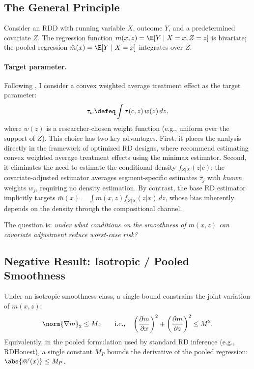 \subsection{The General Principle}\label{sec:overview:principle}

Consider an RDD with running variable $X$, outcome $Y$, and a predetermined covariate $Z$.
The regression function $m(x,z) = \E[Y \mid X = x, Z = z]$ is bivariate; the pooled regression $\bar{m}(x) = \E[Y \mid X = x]$ integrates over $Z$.

\paragraph{Target parameter.}
Following \textcite{imbens_optimized_2019}, I consider a convex weighted average treatment effect as the target parameter:
\begin{equation*}
	\tau_w \defeq \int \tau(c, z)\, w(z)\, dz,
\end{equation*}
where $w(z)$ is a researcher-chosen weight function (e.g., uniform over the support of $Z$).
This choice has two key advantages.
First, it places the analysis directly in the framework of optimized RD designs, where \textcite{imbens_optimized_2019} recommend estimating convex weighted average treatment effects using the minimax estimator.
Second, it eliminates the need to estimate the conditional density $f_{Z|X}(z|c)$: the covariate-adjusted estimator averages segment-specific estimates $\hat\tau_j$ with \emph{known} weights $w_j$, requiring no density estimation.
By contrast, the base RD estimator implicitly targets $\bar{m}(x) = \int m(x,z) f_{Z|X}(z|x)\, dz$, whose bias inherently depends on the density through the compositional channel.

The question is: \emph{under what conditions on the smoothness of $m(x,z)$ can covariate adjustment reduce worst-case risk?}


\subsection{Negative Result: Isotropic / Pooled Smoothness}\label{sec:overview:negative}

Under an isotropic smoothness class, a single bound constrains the joint variation of $m(x,z)$:
\begin{equation*}
	\norm{\nabla m}_2 \leq M, \qquad \text{i.e.,} \quad \left(\frac{\partial m}{\partial x}\right)^2 + \left(\frac{\partial m}{\partial z}\right)^2 \leq M^2.
\end{equation*}
Equivalently, in the pooled formulation used by standard RD inference (e.g., RDHonest), a single constant $M_P$ bounds the derivative of the pooled regression:
$\abs{\bar{m}'(x)} \leq M_P$.

